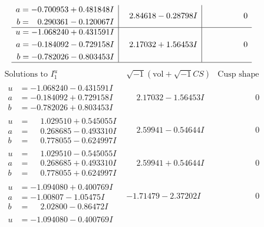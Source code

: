\documentclass[1p]{elsarticle_modified}
\theoremstyle{definition}
\newcommand{\I}{\sqrt{-1}}
\begin{document}
$$\begin{array}{c|c|c}
\begin{aligned}
a &= -0.700953 + 0.481848 I \\
b &= \phantom{-}0.290361 - 0.120067 I\end{aligned}
 & \phantom{-}2.84618 - 0.28798 I & \phantom{-0.000000 } 0 \\ \hline\begin{aligned}
u &= -1.068240 + 0.431591 I \\
a &= -0.184092 - 0.729158 I \\
b &= -0.782026 - 0.803453 I\end{aligned}
 & \phantom{-}2.17032 + 1.56453 I & \phantom{-0.000000 } 0\\
 \hline 
 \end{array}$$\newpage$$\begin{array}{c|c|c}  
\text{Solutions to }I^u_{1}& \I (\text{vol} + \sqrt{-1}CS) & \text{Cusp shape}\\
 \hline 
\begin{aligned}
u &= -1.068240 - 0.431591 I \\
a &= -0.184092 + 0.729158 I \\
b &= -0.782026 + 0.803453 I\end{aligned}
 & \phantom{-}2.17032 - 1.56453 I & \phantom{-0.000000 } 0 \\ \hline\begin{aligned}
u &= \phantom{-}1.029510 + 0.545055 I \\
a &= \phantom{-}0.268685 - 0.493310 I \\
b &= \phantom{-}0.778055 - 0.624997 I\end{aligned}
 & \phantom{-}2.59941 - 0.54644 I & \phantom{-0.000000 } 0 \\ \hline\begin{aligned}
u &= \phantom{-}1.029510 - 0.545055 I \\
a &= \phantom{-}0.268685 + 0.493310 I \\
b &= \phantom{-}0.778055 + 0.624997 I\end{aligned}
 & \phantom{-}2.59941 + 0.54644 I & \phantom{-0.000000 } 0 \\ \hline\begin{aligned}
u &= -1.094080 + 0.400769 I \\
a &= -1.00807 - 1.05475 I \\
b &= \phantom{-}2.02800 - 0.86472 I\end{aligned}
 & -1.71479 - 2.37202 I & \phantom{-0.000000 } 0 \\ \hline\begin{aligned}
u &= -1.094080 - 0.400769 I \\

\end{aligned}
\end{array}$$
\end{document}
